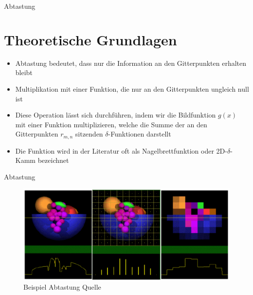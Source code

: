\documentclass{beamer}
\begin{document}
	
	\begin{frame}{Abtastung}
	\section{Theoretische Grundlagen}
	\begin{itemize}
		\item Abtastung bedeutet, dass nur die Information an den Gitterpunkten erhalten bleibt
		\item Multiplikation mit einer Funktion, die nur an den Gitterpunkten ungleich null ist
		\item Diese Operation lässt sich durchführen, indem wir die Bildfunktion $g(x)$ mit einer Funktion multiplizieren, welche die Summe der an den Gitterpunkten $r_{m,n}$ sitzenden $\delta$-Funktionen darstellt
		\item Die Funktion wird in der Literatur oft als Nagelbrettfunktion oder 2D-$\delta$-Kamm bezeichnet
	\end{itemize}	
	\end{frame}
	\begin{frame}{Abtastung}
	\begin{figure}
		\includegraphics[width=1.3\textheight]{sampling.pdf}
		\caption{Beispiel Abtastung Quelle\cite{mit}}
	\end{figure}
	\end{frame}
\end{document}
